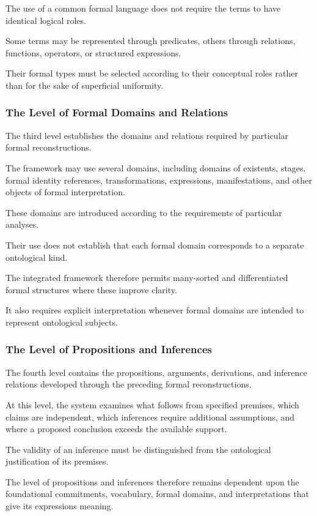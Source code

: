 The use of a common formal language does not
require the terms to have identical logical
roles.

Some terms may be represented through predicates,
others through relations, functions, operators,
or structured expressions.

Their formal types must be selected according
to their conceptual roles rather than
for the sake of superficial uniformity.

\subsubsection{The Level of Formal Domains and Relations}

The third level establishes the domains
and relations required by particular
formal reconstructions.

The framework may use several domains,
including domains of existents, stages,
formal identity references, transformations,
expressions, manifestations, and other
objects of formal interpretation.

These domains are introduced according
to the requirements of particular analyses.

Their use does not establish that
each formal domain corresponds to
a separate ontological kind.

The integrated framework therefore permits
many-sorted and differentiated formal
structures where these improve clarity.

It also requires explicit interpretation
whenever formal domains are intended
to represent ontological subjects.

\subsubsection{The Level of Propositions and Inferences}

The fourth level contains the propositions,
arguments, derivations, and inference
relations developed through the preceding
formal reconstructions.

At this level, the system examines
what follows from specified premises,
which claims are independent, which
inferences require additional assumptions,
and where a proposed conclusion exceeds
the available support.

The validity of an inference must be
distinguished from the ontological
justification of its premises.

The level of propositions and inferences
therefore remains dependent upon the
foundational commitments, vocabulary,
formal domains, and interpretations
that give its expressions meaning.

